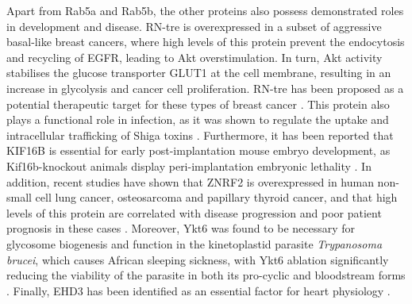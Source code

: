 \documentclass[12pt,english]{article}
\begin{document}
Apart from Rab5a and Rab5b, the other proteins also possess demonstrated roles in development and disease. RN-tre is overexpressed in a subset of aggressive basal-like breast cancers, where high levels of this protein prevent the endocytosis and recycling of EGFR, leading to Akt overstimulation. In turn, Akt activity stabilises the glucose transporter GLUT1 at the cell membrane, resulting in an increase in glycolysis and cancer cell proliferation. RN-tre has been proposed as a potential therapeutic target for these types of breast cancer \citep{Avanzato::2018}. This protein also plays a functional role in infection, as it was shown to regulate the uptake and intracellular trafficking of Shiga toxins \citep{Fuchs::2007}. Furthermore, it has been reported that KIF16B is essential for early post-implantation mouse embryo development, as Kif16b-knockout animals display peri-implantation embryonic lethality \citep{Ueno::2011}. In addition, recent studies have shown that ZNRF2 is overexpressed in human non-small cell lung cancer, osteosarcoma and papillary thyroid cancer, and that high levels of this protein are correlated with disease progression and poor patient prognosis in these cases \citep{Zhang::2016,Xiao::2017,Cui::2019}. Moreover, Ykt6 was found to be necessary for glycosome biogenesis and function in the kinetoplastid parasite \textit{Trypanosoma brucei}, which causes African sleeping sickness, with Ykt6 ablation significantly reducing the viability of the parasite in both its pro-cyclic and bloodstream forms \citep{Banerjee::2017}. Finally, EHD3 has been identified as an essential factor for heart physiology \citep{Curran::2014}.
\end{document}
